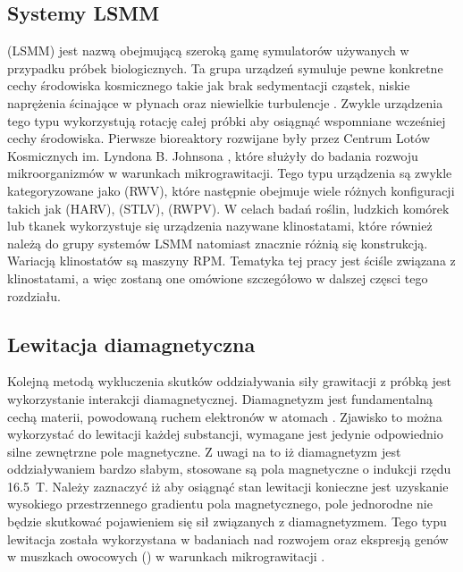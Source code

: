 \subsection{Systemy LSMM}

 (LSMM) jest nazwą obejmującą szeroką gamę symulatorów używanych w przypadku próbek
 biologicznych. Ta grupa urządzeń symuluje pewne konkretne cechy środowiska kosmicznego
  takie jak brak sedymentacji cząstek, niskie naprężenia ścinające w płynach oraz niewielkie
   turbulencje \cite{bib:lsmm1}. Zwykle urządzenia tego typu wykorzystują rotację całej
    próbki aby osiągnąć wspomniane wcześniej cechy środowiska. Pierwsze bioreaktory
     rozwijane były przez Centrum Lotów Kosmicznych im. Lyndona B. Johnsona
       \cite{bib:lsmm1}, które służyły do badania rozwoju mikroorganizmów w warunkach
       mikrograwitacji. Tego typu urządzenia są zwykle kategoryzowane jako   (RWV), które
        następnie obejmuje wiele różnych konfiguracji takich jak  (HARV),  (STLV),  (RWPV). W
         celach badań roślin, ludzkich komórek lub tkanek wykorzystuje się urządzenia
          nazywane klinostatami, które również należą do grupy systemów
           LSMM \cite{bib:nasa_space_biology} natomiast znacznie różnią się konstrukcją.
            Wariacją klinostatów są maszyny RPM. Tematyka tej pracy jest ściśle związana
             z klinostatami, a więc zostaną one omówione szczegółowo w dalszej częsci
              tego rozdziału.

\subsection{Lewitacja diamagnetyczna}

Kolejną metodą wykluczenia skutków oddziaływania siły grawitacji z próbką jest
 wykorzystanie interakcji diamagnetycznej. Diamagnetyzm jest fundamentalną cechą
  materii, powodowaną ruchem elektronów w atomach \cite{bib:kittel}. Zjawisko to można
   wykorzystać do lewitacji każdej substancji, wymagane jest jedynie odpowiednio silne
    zewnętrzne pole magnetyczne. Z uwagi na to iż diamagnetyzm jest oddziaływaniem
     bardzo słabym, stosowane są pola magnetyczne o indukcji rzędu \SI{16.5}{T}. Należy
      zaznaczyć iż aby osiągnąć stan lewitacji konieczne jest uzyskanie wysokiego
       przestrzennego gradientu pola magnetycznego, pole jednorodne nie będzie skutkować
        pojawieniem się sił związanych z diamagnetyzmem. Tego typu lewitacja została
         wykorzystana w badaniach nad rozwojem oraz ekspresją genów w muszkach owocowych
          () w warunkach
           mikrograwitacji \cite{bib:lewitacja}.

